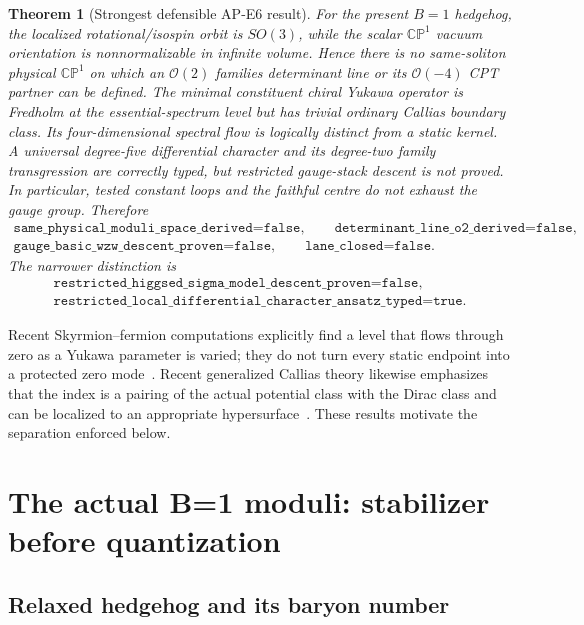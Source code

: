 \documentclass[11pt]{article}
\newtheorem{theorem}{Theorem}[section]
\theoremstyle{definition}
\theoremstyle{remark}
\newcommand{\CP}{\mathbb {CP}}
\newcommand{\cO}{\mathcal O}
\begin{document}
\begin{theorem}[Strongest defensible AP-E6 result]
For the present \(B=1\) hedgehog, the localized rotational/isospin orbit is
\(SO(3)\), while the scalar \(\CP^1\) vacuum orientation is nonnormalizable in
infinite volume.  Hence there is no same-soliton physical \(\CP^1\) on which
an \(\cO(2)\) families determinant line or its \(\cO(-4)\) CPT partner can be
defined.  The minimal constituent chiral Yukawa operator is Fredholm at the
essential-spectrum level but has trivial ordinary Callias boundary class.
Its four-dimensional spectral flow is logically distinct from a static
kernel.  A universal degree-five differential character and its degree-two
family transgression are correctly typed, but restricted gauge-stack descent
is not proved.  In particular, tested constant loops and the faithful centre
do not exhaust the gauge group.  Therefore
\[
 \begin{gathered}
 \texttt{same\_physical\_moduli\_space\_derived=false},\qquad
 \texttt{determinant\_line\_o2\_derived=false},\\
 \texttt{gauge\_basic\_wzw\_descent\_proven=false},\qquad
 \texttt{lane\_closed=false}.
 \end{gathered}
\]
The narrower distinction is
\[
\begin{gathered}
\texttt{restricted\_higgsed\_sigma\_model\_descent\_proven=false},\\
\texttt{restricted\_local\_differential\_character\_ansatz\_typed=true}.
\end{gathered}
\]
\end{theorem}

Recent Skyrmion--fermion computations explicitly find a level that flows
through zero as a Yukawa parameter is varied; they do not turn every static
endpoint into a protected zero mode~\cite{DzhunushalievEtAl2024APE6}.  Recent
generalized Callias theory likewise emphasizes that the index is a pairing of
the actual potential class with the Dirac class and can be localized to an
appropriate hypersurface~\cite{VanDenDungen2025APE6}.  These results motivate
the separation enforced below.

\section{The actual B=1 moduli: stabilizer before quantization}

\subsection{Relaxed hedgehog and its baryon number}
\end{document}
